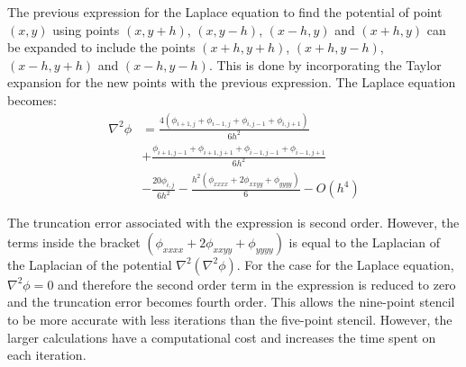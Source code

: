 The previous expression for the Laplace equation to find the potential of point $(x,y)$
using points $(x,y+h)$, $(x,y-h)$, $(x-h,y)$ and $(x+h,y)$ can be expanded to
include the points $(x+h,y+h)$, $(x+h,y-h)$, $(x-h,y+h)$ and $(x-h,y-h)$. This is
done by incorporating the Taylor expansion for the new points with the
previous expression. The Laplace equation becomes:
%
\begin{align}
\nabla ^2 \phi &= \frac{4(\phi_{i+1,j} + \phi_{i-1,j} + \phi_{i,j-1} + \phi_{i,j+1})}{6h^2} \nonumber \\
&+ \frac{\phi_{i+1,j-1} + \phi_{i+1,j+1} + \phi_{i-1,j-1} + \phi_{i-1,j+1}}{6h^2} \nonumber \\
&- \frac{20\phi_{i,j}}{6h^2} - \frac{h^2(\phi_{xxxx} + 2 \phi_{xxyy} + \phi_{yyyy})}{6} - O(h^4)
\end{align}

The truncation error associated with the expression is second order. However, the terms
inside the bracket $(\phi_{xxxx} + 2 \phi_{xxyy} + \phi_{yyyy})$ is equal to the
Laplacian of the Laplacian of the potential $\nabla^2 (\nabla ^2 \phi)$. For the case
for the Laplace equation, $\nabla ^2 \phi = 0$ and therefore the second order term in
the expression is reduced to zero and the truncation error becomes fourth order. This
allows the nine-point stencil to be more accurate with less iterations than the
five-point stencil. However, the larger calculations have a computational cost and
increases the time spent on each iteration.
